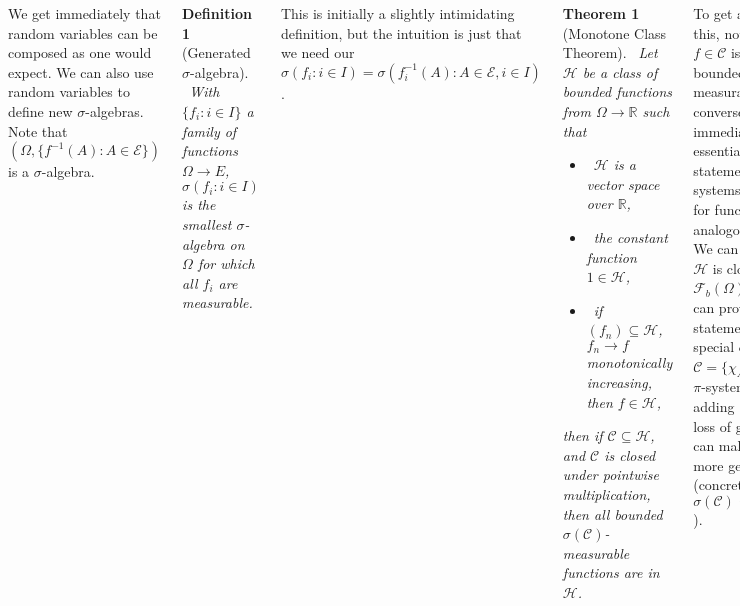 \documentclass{tikzposter} %
\newtheorem{theorem}{Theorem}
\newtheorem{definition}{Definition}
\begin{document}
\begin{columns}
{    We get immediately that random variables can be composed as one would expect. We can also use random variables to define new $\sigma$-algebras. Note that $(\Omega, \{f^{-1}(A) : A \in \mathcal{E}\})$ is a $\sigma$-algebra. \\

    \begin{definition}[Generated $\sigma$-algebra]
    \ With $\{f_{i} : i \in I\}$ a family of functions $\Omega \to E$, $\sigma(f_{i} : i \in I)$ is the smallest $\sigma$-algebra on $\Omega$ for which all $f_{i}$ are measurable.
    \end{definition}
    \hphantom{}

    This is initially a slightly intimidating definition, but the intuition is just that we need our $\sigma(f_{i} : i \in I) = \sigma(f_{i}^{-1}(A) : A \in \mathcal{E}, i \in I)$. \\

    \begin{theorem}[Monotone Class Theorem]
      \ Let $\mathcal{H}$ be a class of bounded functions from $\Omega \to \mathbb{R}$ such that
      \begin{itemize}
              \item \ $\mathcal{H}$ is a vector space over $\mathbb{R}$,
              \item \ the constant function $1 \in \mathcal{H}$,
              \item \ if $(f_{n}) \subseteq \mathcal{H}$, $f_{n} \to f$ monotonically increasing, then $f \in \mathcal{H}$,
      \end{itemize}
      then if $\mathcal{C} \subseteq \mathcal{H}$, and $\mathcal{C}$ is closed under pointwise multiplication, then all bounded $\sigma(\mathcal{C})$-measurable functions are in $\mathcal{H}$.
    \end{theorem}
    \hphantom{}

    To get an intuition for this, note that any $f \in \mathcal{C}$ is necessarily bounded and $\sigma(\mathcal{C})$-measurable, but the converse is not immediate. Thus we essentially get a statement of the $\lambda$-$\pi$ systems lemma but for functions on analogous systems. \\

    We can firstly see that $\mathcal{H}$ is closed in $\mathcal{F}_{b}(\Omega)$. Then, we can prove the statement for the special case of $\mathcal{C} = \{\chi_{A} : A \in \mathcal{A}\}$ for a $\pi$-system $\mathcal{A}$, then adding $1$ to $\mathcal{C}$ without loss of generality we can make the proof more general (concretely, because $\sigma(\mathcal{C}) \subseteq \sigma(\mathcal{C} \cup \{1\})$). \\

}
\end{columns}
\end{document}
